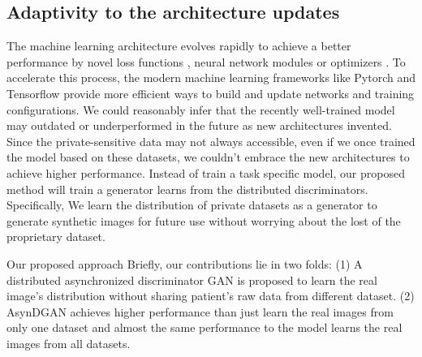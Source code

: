 \subsection{Adaptivity to the architecture updates}
The machine learning architecture evolves rapidly to achieve a better performance by novel loss functions \cite{sudre2017generalised,hochberg1964depth}, neural network modules \cite{hoffman2016fcn, ronneberger2015u,milletari2016v} or optimizers \cite{ruder2016overview, zeiler2012adadelta, mason2000boosting} . To accelerate this process, the modern machine learning frameworks like Pytorch \cite{ketkar2017introduction} and Tensorflow \cite{abadi2016tensorflow} provide more efficient ways to build and update networks and training configurations. We could reasonably infer that the recently well-trained model may outdated or underperformed in the future as new architectures invented. Since the private-sensitive data may not always accessible, even if we once trained the model based on these datasets, we couldn't embrace the new architectures to achieve higher performance. Instead of train a task specific model, our proposed method will train a generator learns from the distributed discriminators. Specifically, We learn the distribution of private datasets as a generator to generate synthetic images for future use without worrying about the lost of the proprietary dataset.

Our proposed approach
Briefly, our contributions lie in two folds: (1) A distributed asynchronized discriminator GAN is proposed to learn the real image's distribution without sharing patient's raw data from different dataset. (2) AsynDGAN achieves higher performance than just learn the real images from only one dataset and almost the same performance to the model learns the real images from all datasets.



%
%



